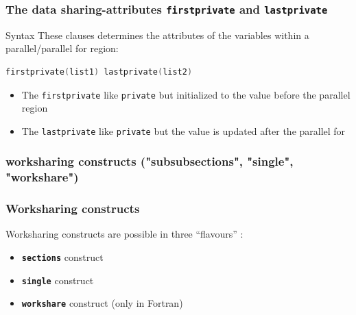 \begin{frame}[containsverbatim]
\frametitle{The data sharing-attributes \texttt{firstprivate} and \texttt{lastprivate}}
\begin{exampleblock}{Syntax}
These clauses determines the attributes of the variables within a parallel/parallel for region:
\begin{lstlisting}[language=C,frame=lines]
firstprivate(list1) lastprivate(list2)
\end{lstlisting}
\begin{itemize}
\item{The \texttt{firstprivate} like {\tt private} but initialized to the value before the parallel region}
\item{The \texttt{lastprivate}  like {\tt private} but the value is updated after the parallel for}
\end{itemize}
\end{exampleblock}
\end{frame}




\subsubsection[Worksharing constructs]{worksharing constructs ("subsubsections", "single", "workshare")}



\begin{frame}[containsverbatim]
\frametitle{Worksharing constructs}

\begin{block}{}
Worksharing constructs are possible in three ``flavours'' :
\begin{itemize}
\item{\textbf{\texttt{sections}} construct}
\item{\textbf{\texttt{single}} construct}
\item{\textbf{\texttt{workshare}} construct (only in Fortran)}
\end{itemize}
\end{block}

\end{frame}



